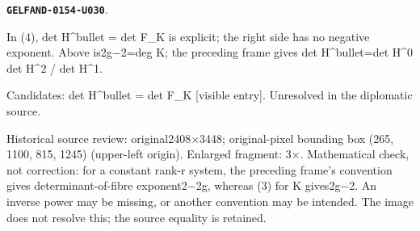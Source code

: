 \documentclass[11pt]{article}
\theoremstyle{definition}
\theoremstyle{remark}
\begin{document}
\par\noindent\leavevmode{}\label{GELFAND-0154-U030}\label{GELFAND-P001422:eq4-determinant-convention:note}\textbf{\texttt{GELFAND-0154-U030}}.\nopagebreak[4]\par
In (4), det H\textasciicircum{}bullet = det F\_K is explicit; the right side has no negative exponent. Above is2g−2=deg K; the preceding frame gives det H\textasciicircum{}bullet=det H\textasciicircum{}0 det H\textasciicircum{}2 / det H\textasciicircum{}1.\par
Candidates: det H\textasciicircum{}bullet = det F\_K [visible entry]. Unresolved in the diplomatic source.\par
Historical source review: original2408×3448; original-pixel bounding box (265, 1100, 815, 1245) (upper-left origin). Enlarged fragment: 3×. Mathematical check, not correction: for a constant rank-r system, the preceding frame’s convention gives determinant-of-fibre exponent2−2g, whereas (3) for K gives2g−2. An inverse power may be missing, or another convention may be intended. The image does not resolve this; the source equality is retained.\par\medskip
\end{document}

